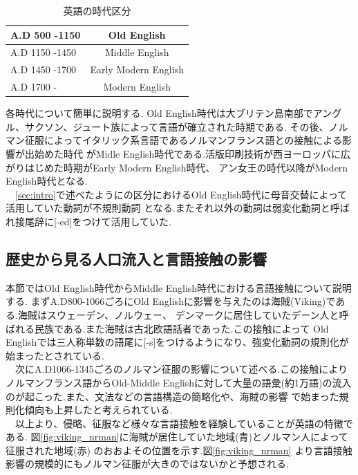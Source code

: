 \documentclass[10.5pt, a4j, twocolumn]{jsarticle}
\begin{document}
{\small
\begin{table}[htbp]
 \centering
 \caption{英語の時代区分\label{tab:eng_div_table}}
 \begin{tabular}{l|c}
  \hline
  A.D 500 -1150 & Old English \\
  \hline
  A.D 1150 -1450 & Middle English \\
  \hline
  A.D 1450 -1700 & Early Modern English \\
  \hline
  A.D 1700 - & Modern English \\
  \hline
\end{tabular}
\end{table}
}
各時代について簡単に説明する.
Old English時代は大ブリテン島南部でアングル、サクソン、ジュート族によって言語が確立された時期である.
その後、ノルマン征服によってイタリック系言語であるノルマンフランス語との接触による影響が出始めた時代
がMidle English時代である.活版印刷技術が西ヨーロッパに広がりはじめた時期がEarly Modern English時代、
アン女王の時代以降がModern English時代となる.\\
　\ref{sec:intro}で述べたようにの区分におけるOld English時代に母音交替によって活用していた動詞が不規則動詞
となる.またそれ以外の動詞は弱変化動詞と呼ばれ接尾辞に[-ed]をつけて活用していた.

\subsection{歴史から見る人口流入と言語接触の影響}\label{sec:lang_contact}
本節ではOld English時代からMiddle English時代における言語接触\cite{philip}について説明する.
まずA.D800-1066ごろにOld Englishに影響を与えたのは海賊(Viking)である.海賊はスウェーデン、ノルウェー、
デンマークに居住していたデーン人と呼ばれる民族である.また海賊は古北欧語話者であった.この接触によって
Old Englishでは三人称単数の語尾に[-s]をつけるようになり、強変化動詞の規則化が始まったとされている.\\
　次にA.D1066-1345ごろのノルマン征服の影響について述べる.この接触によりノルマンフランス語からOld-Middle
Englishに対して大量の語彙(約1万語)の流入のが起こった.また、文法などの言語構造の簡略化や、海賊の影響
で始まった規則化傾向も上昇したと考えられている.\\
　以上より、侵略、征服など様々な言語接触を経験していることが英語の特徴である.
図\ref{fig:viking_nrman}に海賊が居住していた地域(青)とノルマン人によって征服された地域(赤)
のおおよその位置を示す.図\ref{fig:viking_nrman}
より言語接触影響の規模的にもノルマン征服が大きのではないかと予想される.
\end{document}
